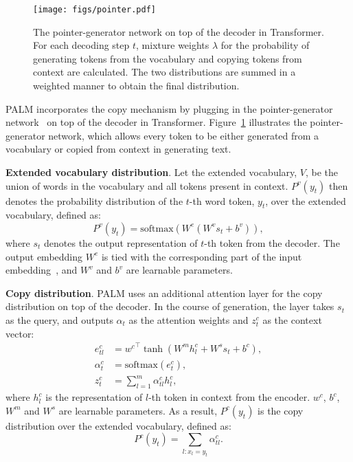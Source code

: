 \documentclass[11pt,a4paper]{article}
\newcommand{\method}{PALM\xspace}
\begin{document}
\begin{figure}[t]
    \centering
    \texttt{[image: figs/pointer.pdf]}
    \caption{The pointer-generator network on top of the decoder in Transformer. For each decoding step $t$, mixture weights $\lambda$ for the probability of generating tokens from the vocabulary and copying tokens from context are calculated. The two distributions are summed in a weighted manner to obtain the final distribution.}
    \label{fig:pointer}
\end{figure}

\method incorporates the copy mechanism by plugging in the pointer-generator network~\cite{See:2017,Nishida:2019} on top of the decoder in Transformer. Figure~\ref{fig:pointer} illustrates the pointer-generator network, which allows every token to be either generated from a vocabulary or copied from context in generating text.

\textbf{Extended vocabulary distribution}. Let the extended vocabulary, $V$, be the union of words in the vocabulary and all tokens present in context. $P^v(y_t)$ then denotes the probability distribution of the $t$-th word token, $y_t$, over the extended vocabulary, defined as:
\begin{equation}
    P^v(y_t) = \text{softmax}(W^e(W^v s_t + b^v)),
\end{equation}
where $s_t$ denotes the output representation of $t$-th token from the decoder. The output embedding $W^e$ is tied with the corresponding part of the input embedding~\cite{Inan:2017}, and $W^v$ and $b^v$ are learnable parameters.

\textbf{Copy distribution}. \method uses an additional attention layer for the copy distribution on top of the decoder. In the course of generation, the layer takes $s_t$ as the query, and outputs $\alpha_t$ as the attention weights and $z_t^c$ as the context vector:
\begin{align}
e_{tl}^c&={w^c}^\top \tanh(W^m h_l^c + W^s s_t + b^c),\\
\alpha_t^c&=\text{softmax}(e_t^c),\\
z_t^c&=\sum_{l=1}^m \alpha_{tl}^c h_l^c,
\end{align}
where $h_l^c$ is the representation of $l$-th token in context from the encoder. $w^c$, $b^c$, $W^m$ and $W^s$ are learnable parameters. As a result, $P^c(y_t)$ is the copy distribution over the extended vocabulary, defined as:
\begin{equation}
    P^c(y_t)=\sum_{l:x_l=y_t} \alpha_{tl}^c.
\end{equation}
\end{document}
